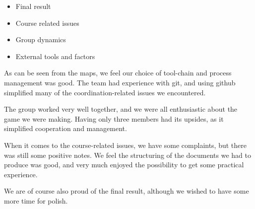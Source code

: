 \documentclass[titlepage,a4paper,11pt]{article}
\begin{document}
\begin{itemize}
    \item Final result
    \item Course related issues
    \item Group dynamics
    \item External tools and factors
\end{itemize}

As can be seen from the maps, we feel our choice of tool-chain and
process management was good. The team had experience with git, and using
github simplified many of the coordination-related issues we encountered.

The group worked very well together, and we were all enthusiastic about
the game we were making. Having only three members had its upsides, as it
simplified cooperation and management.

When it comes to the course-related issues, we have some complaints, but
there was still some positive notes.  We feel the structuring of the
documents we had to produce was good, and very much enjoyed the possibility
to get some practical experience.

We are of course also proud of the final result, although we wished to
have some more time for polish.
\end{document}

